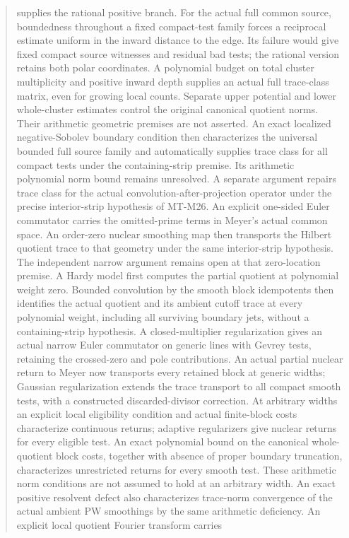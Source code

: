 \documentclass[11pt,a4paper]{article}
\begin{document}
\begin{abstract}
supplies the rational positive branch.
For the actual full common source, boundedness throughout a fixed
compact-test family forces a reciprocal estimate uniform in the
inward distance to the edge. Its failure would give fixed compact
source witnesses and residual bad tests; the rational version
retains both polar coordinates. A polynomial budget on total
cluster multiplicity and positive inward depth supplies an actual
full trace-class matrix, even for growing local counts. Separate
upper potential and lower whole-cluster estimates control the
original canonical quotient norms. Their arithmetic geometric
premises are not asserted. An exact localized negative-Sobolev
boundary condition then characterizes the universal bounded full
source family and automatically supplies trace class for all
compact tests under the containing-strip premise. Its arithmetic
polynomial norm bound remains unresolved.
A separate argument repairs trace class for
the actual convolution-after-projection operator under the precise
interior-strip hypothesis of MT-M26. An explicit one-sided Euler
commutator carries the omitted-prime terms in Meyer's actual common
space. An order-zero nuclear smoothing map then transports the
Hilbert quotient trace to that geometry under the same interior-strip
hypothesis. The independent narrow argument remains open at that
zero-location premise. A Hardy model first computes the partial
quotient at polynomial weight zero. Bounded convolution by the
smooth block idempotents then identifies the actual quotient and
its ambient cutoff trace at every polynomial weight, including all
surviving boundary jets, without a containing-strip hypothesis.
A closed-multiplier regularization gives an actual narrow
Euler commutator on generic lines with Gevrey tests, retaining
the crossed-zero and pole contributions. An actual partial nuclear
return to Meyer now transports every retained block at generic
widths; Gaussian regularization extends the trace transport to
all compact smooth tests, with a constructed discarded-divisor
correction. At arbitrary widths an explicit local eligibility condition
and actual finite-block costs characterize continuous returns; adaptive
regularizers give nuclear returns for every eligible test. An exact
polynomial bound on the canonical whole-quotient block costs,
together with absence of proper boundary truncation, characterizes
unrestricted returns for every smooth test. These arithmetic norm
conditions are not assumed to hold at an arbitrary width. An exact
positive resolvent defect also characterizes trace-norm convergence
of the actual ambient PW smoothings by the same arithmetic deficiency. An explicit local quotient Fourier transform carries

\end{abstract}
\end{document}
